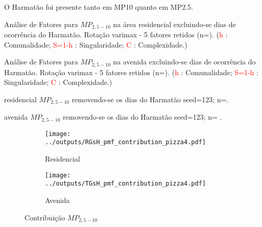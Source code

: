 O Harmatão foi presente tanto em MP10 quanto em MP2.5.

\begin{table}[H]
  
  \caption{Análise de Fatores para $MP_{2,5-10}$ na área residencial
           excluindo-se dias de ocorrência do Harmatão.
           Rotação varimax - 5 fatores retidos (n=).
           (\textcolor{red}{h} : Comunalidade; 
           \textcolor{red}{S=1-h} : Singularidade; 
           \textcolor{red}{C} : Complexidade.)
           \label{table:loadings_RGsH4}}
\end{table}

\begin{table}[H]
  
  \caption{Análise de Fatores para $MP_{2,5-10}$ na avenida
           excluindo-se dias de ocorrência do Harmatão.
           Rotação varimax - 5 fatores retidos (n=).
           (\textcolor{red}{h} : Comunalidade; 
           \textcolor{red}{S=1-h} : Singularidade; 
           \textcolor{red}{C} : Complexidade.)
           \label{table:loadings_TGsH4}}
\end{table}

\begin{table}[H]
  \centering
    
    \caption{residencial $MP_{2,5-10}$ removendo-se os dias do Harmatão 
              seed=123; n=. 
             \label{table:RGsH_profiles4}}
\end{table}

\begin{table}[H]
  \centering
    
    \caption{avenida $MP_{2,5-10}$ removendo-se os dias do Harmatão 
              seed=123; n= . 
             \label{table:TGsH_profiles4}}
\end{table}


\begin{figure}[H]
  \centering
  \begin{subfigure}[b]{0.45\textwidth}
    \texttt{[image: ../outputs/RGsH\_pmf\_contribution\_pizza4.pdf]}
    \caption{Residencial}
  \end{subfigure}%
  \begin{subfigure}[b]{0.45\textwidth}
    \texttt{[image: ../outputs/TGsH\_pmf\_contribution\_pizza4.pdf]}
    \caption{Avenida}
  \end{subfigure}
  \caption{Contribuição $MP_{2,5-10}$ \label{qqq}}
\end{figure}



%
%
%
